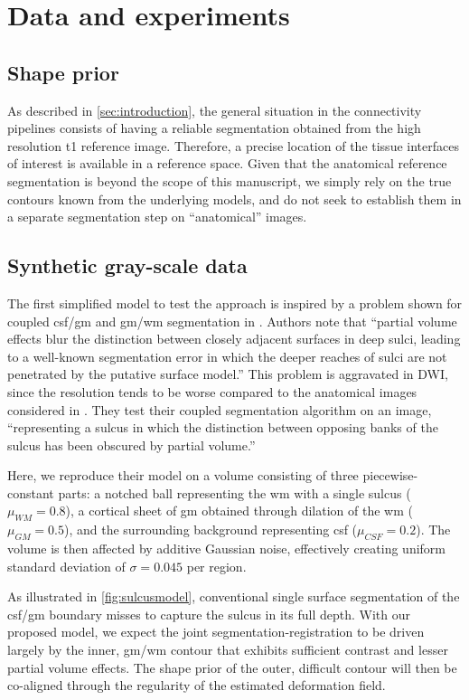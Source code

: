 \section{Data and experiments}
\label{sec:experiments}
%
\subsection{Shape prior}
%
As described in \autoref{sec:introduction}, the general situation in
the connectivity pipelines consists of having 
a reliable segmentation obtained from the high resolution \ac{t1} 
reference image. Therefore, a precise location of the tissue interfaces
of interest is available in a reference space. Given that the anatomical 
reference segmentation is beyond the scope of this manuscript, we simply 
rely on the true contours known from the underlying models, and do not 
seek to establish them in a separate segmentation step on ``anatomical'' images.
%
\subsection{Synthetic gray-scale data}
%
The first simplified model to test the approach is inspired by a problem 
shown for coupled \ac{csf}/\ac{gm} and \ac{gm}/\ac{wm} segmentation in \citep{macdonald_automated_2000}. Authors note that ``partial volume effects 
blur the distinction between closely adjacent surfaces in deep sulci, leading 
to a well-known segmentation error in which the deeper reaches of sulci are 
not penetrated by the putative surface model.'' This problem is aggravated 
in DWI, since the resolution tends to be worse compared to the anatomical 
images considered in \citep{macdonald_automated_2000}. They test their 
coupled segmentation algorithm on an image, ``representing a sulcus in 
which the distinction between opposing banks of the sulcus has been obscured 
by partial volume.''  

Here, we reproduce their model on a volume consisting of three 
piecewise-constant parts: a notched ball representing the \ac{wm} with a single 
sulcus ($\mu_{WM} = 0.8$), a cortical sheet of \ac{gm} obtained through dilation 
of the \ac{wm} ($\mu_{GM} = 0.5$), and the surrounding background representing 
\ac{csf} ($\mu_{CSF} = 0.2$). The volume is then affected by additive Gaussian 
noise, effectively creating uniform standard deviation of $\sigma = 0.045$ per 
region.

As illustrated in \autoref{fig:sulcusmodel}, conventional single surface 
segmentation of the \ac{csf}/\ac{gm} boundary misses to capture the sulcus in 
its full depth. With our proposed model, we expect the joint 
segmentation-registration to be driven largely by the inner, \ac{gm}/\ac{wm}
contour that exhibits sufficient contrast and lesser partial volume effects. 
The shape prior of the outer, difficult contour will then be co-aligned through 
the regularity of the estimated deformation field.

